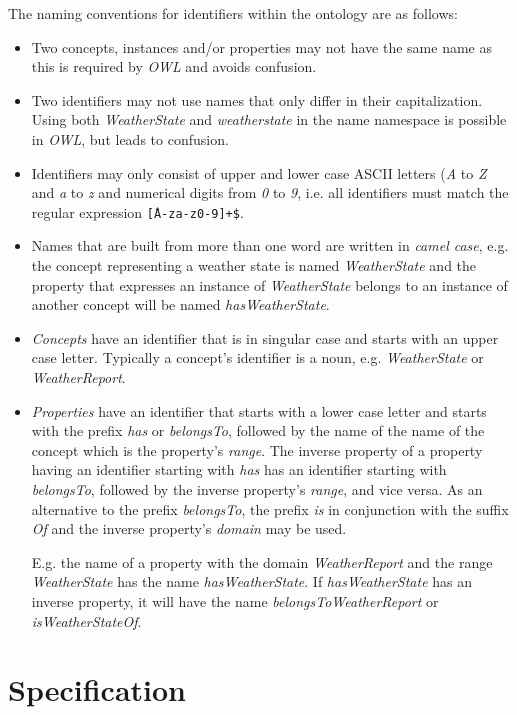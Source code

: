 The naming conventions for identifiers within the ontology are as follows:
\begin{itemize}
  \item Two concepts, instances and/or properties may not have the same name as this is required by \emph{OWL}\cite{OWL} and avoids confusion.
  \item Two identifiers may not use names that only differ in their capitalization. Using both \emph{WeatherState} and \emph{weatherstate} in the name namespace is possible in \emph{OWL}, but leads to confusion.
  \item Identifiers may only consist of upper and lower case ASCII letters (\emph{A} to \emph{Z} and \emph{a} to \emph{z} and numerical digits from \emph{0} to \emph{9}, i.e. all identifiers must match the regular expression \texttt{\^[A-za-z0-9]+\$}.
  \item Names that are built from more than one word are written in \emph{camel case}\cite{CamelCase}, e.g. the concept representing a weather state is named \emph{WeatherState} and the property that expresses an instance of \emph{WeatherState} belongs to an instance of another concept will be named \emph{hasWeatherState}.
  \item \emph{Concepts} have an identifier that is in singular case and starts with an upper case letter. Typically a concept's identifier is a noun, e.g. \emph{WeatherState} or \emph{WeatherReport}.
  \item \emph{Properties} have an identifier that starts with a lower case letter and starts with the prefix \emph{has} or \emph{belongsTo}, followed by the name of the name of the concept which is the property's \emph{range}. The inverse property of a property having an identifier starting with \emph{has} has an identifier starting with \emph{belongsTo}, followed by the inverse property's \emph{range}, and vice versa. As an alternative to the prefix \emph{belongsTo}, the prefix \emph{is} in conjunction with the suffix \emph{Of} and the inverse property's \emph{domain} may be used.
  
  E.g. the name of a property with the domain \emph{WeatherReport} and the range \emph{WeatherState} has the name \emph{hasWeatherState}. If \emph{hasWeatherState} has an inverse property, it will have the name \emph{belongsToWeatherReport} or \emph{isWeatherStateOf}.
\end{itemize}


\section{Specification}
\label{sec:ontology_specification}

